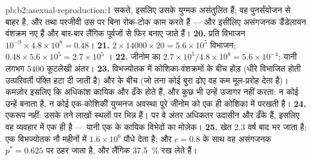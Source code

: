 \begin{solution}{pb:b2:asexual-reproduction:1}
सकते, इसलिए उसके युग्मक असंतुलित हैं; वह पुनर्संयोजन से बाहर है, और
 तथा परजीवी उस पर बिना रोक-टोक काम करते हैं --- और इसीलिए
असंगजनक डैंडेलायन वंशक्रम नए हैं और बार-बार लैंगिक पूर्वजों से फिर बनाए
जाते हैं।
\textbf{20.} प्रति विभाजन $10^{-9}\times 4.8\times 10^{8} = 0.48$।
\textbf{21.} $2\times \num{14000}\times 20 = 5.6\times 10^{5}$
विभाजन; $0.48\times 5.6\times 10^{5} = 2.7\times 10^{5}$
।
\textbf{22.} जीनोम का $2.7\times 10^{5}/4.8\times 10^{8} = 5.6\times 10^{-4}$;
यानी लगभग \num{5400} कूटलेखी अंतर।
\textbf{23.} विभज्योतक में कोशिका-वंशक्रमों के बीच होड़ (धीरे विभाजित
होती उत्परिवर्ती पंक्ति हटा दी जाती है) और  के बीच (जो तना
कोई बुरा  ढोए वह कम मूल-प्ररोह देता है)। कमज़ोर इसलिए कि
अधिकांश कायिक   और ढँके होते हैं, और कुछ भी उन्हें
उजागर नहीं करता: न कोई  उन्हें  बनाता है, न
कोई एक-कोशिकी युग्मनज अवस्था पूरे जीनोम को एक ही कोशिका में परखती है।
\textbf{24.} एकरूप नहीं: उसके तने लाखों स्थलों पर भिन्न हैं। पर वे
अंतर अधिकतर उदासीन और ढँके हैं, इसलिए वह
 व्यवहार में एक ही  है --- यानी एक  के कायिक विभेदों
का मोज़ेक।
\textbf{25.} खेत 2.3 वर्ष बाद भर जाता है; एक विभज्योतक नौ महीनों में
$1.6\times 10^{6}$ पौधे देता है; और $c = 0.8$ के साथ वह असंगजनक
$p^* = 0.625$ पर ठहर जाता है, और लैंगिक \qty{37.5}{\%} रख लेते हैं।
\end{solution}
